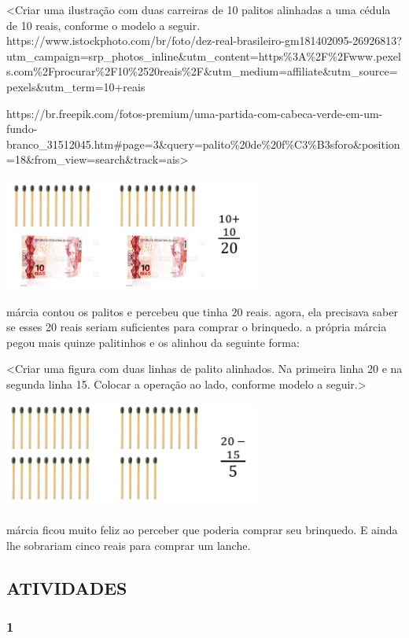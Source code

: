 \textless{}Criar uma ilustração com duas carreiras de 10 palitos
alinhadas a uma cédula de 10 reais, conforme o modelo a seguir.
https://www.istockphoto.com/br/foto/dez-real-brasileiro-gm181402095-26926813?utm\_campaign=srp\_photos\_inline\&utm\_content=https\%3A\%2F\%2Fwww.pexels.com\%2Fprocurar\%2F10\%2520reais\%2F\&utm\_medium=affiliate\&utm\_source=pexels\&utm\_term=10+reais

https://br.freepik.com/fotos-premium/uma-partida-com-cabeca-verde-em-um-fundo-branco\_31512045.htm\#page=3\&query=palito\%20de\%20f\%C3\%B3sforo\&position=18\&from\_view=search\&track=ais\textgreater{}

\includegraphics[width=3.31224in,height=1.46877in]{media/image13.png}

márcia contou os palitos e percebeu que tinha 20 reais. agora, ela
precisava saber se esses 20 reais seriam suficientes para comprar o
brinquedo. a própria márcia pegou mais quinze palitinhos e os alinhou da
seguinte forma:

\textless{}Criar uma figura com duas linhas de palito alinhados. Na
primeira linha 20 e na segunda linha 15. Colocar a operação ao lado,
conforme modelo a seguir.\textgreater{}

\includegraphics[width=3.31185in,height=1.38526in]{media/image14.png}

márcia ficou muito feliz ao perceber que poderia comprar seu brinquedo.
E ainda lhe sobrariam cinco reais para comprar um lanche.

\subsection{ATIVIDADES}\label{atividades-1}

\subsubsection{1}\label{section-8}

